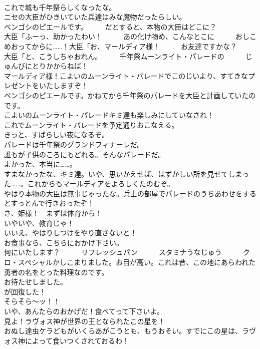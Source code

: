 \documentclass[8pt]{extreport}
\begin{document}
\begin{CJK}{UTF8}{min}
\\	これで城も千年祭らしくなったな。	
\\	ニセの大臣がひきいていた兵達はみな魔物だったらしい。	
\\	ベンゴシのピエールです。　　　だとすると、本物の大臣はどこに？	
\\	大臣「ふーっ、助かったわい！　　　あの化け物め、こんなとこに　　　おしこめおってからに……！大臣「お、マールディア様！　　　お友達ですかな？	
\\	大臣「と、こうしちゃおれん。　　　千年祭ムーンライト・パレードの　　　じゅんびにとりかからねば！	
\\	マールディア様！こよいのムーンライト・パレードでこのじいより、すてきなプレゼントをいたしますぞ！	
\\	ベンゴシのピエールです。かねてから千年祭のパレードを大臣と計画していたのです。	
\\	こよいのムーンライト・パレードキミ達も楽しみにしていなされ！	
\\	これでムーンライト・パレードを予定通りおこなえる。 
\\	きっと、すばらしい夜になるぞ。 
\\	パレードは千年祭のグランドフィナーレだ。 
\\	誰もが子供のころにもどれる。そんなパレードだ。	
\\	よかった、本当に……。	
\\	すまなかったな、キミ達。いや、思いかえせば、はずかしい所を見せてしまった……。これからもマールディアをよろしくたのむぞ。	
\\	やはり本物の大臣は無事じゃったな。兵士の部屋でパレードのうちあわせをするとすっとんで行きおったぞ！	
\\	さ、姫様！　まずは体育から！ 
\\	いやいや、教育じゃ！ 
\\	いいえ、やはりしつけをやり直さないと！	
\\	お食事なら、こちらにおかけ下さい。	
\\	何にいたします？　　　リフレッシュパン　　　スタミナうなじゅう　　　クロ・スペシャルかしこまりました。お目が高い。これは昔、この地にあらわれた勇者の名をとった料理なのです。	
\\	お待たせしました。　　　　　　　
\\	が回復した！	
\\	そらそら～ッ！！	
\\	いや、あんたらのおかげだ！食べてって下さいよ。	
\\	見よ！ラヴォス神が世界の王となられたこの星を！	
\\	おぬし達虫ケラどもがいくらあがこうとも、もうおそい。すでにこの星は、ラヴォス神によって食いつくされておるわ！	

\end{CJK}
\end{document}
